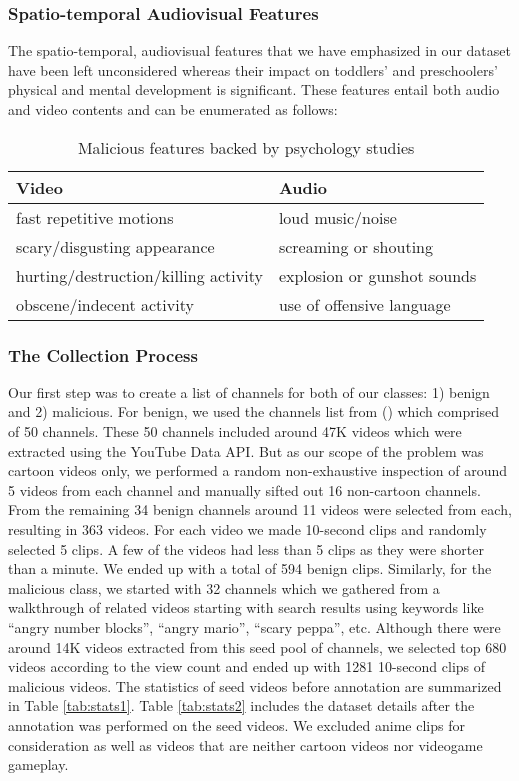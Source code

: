 \documentclass[letterpaper]{article}
\begin{document}
\subsubsection{Spatio-temporal Audiovisual Features}
The spatio-temporal, audiovisual features that we have emphasized in our dataset have been left unconsidered whereas their impact on toddlers' and preschoolers' physical and mental development is significant. These features entail both audio and video contents and can be enumerated as follows:
\begin{table}[h!]
\centering
\begin{tabular}{|p{} | p{}|}
 \hline
 \rowcolor{Gray}
 \textbf{Video} & \textbf{Audio} \\ [0.5ex] 
 \hline
 fast repetitive motions & loud music/noise\\ 
 \hline
 scary/disgusting appearance & screaming or shouting\\
 \hline
 hurting/destruction/killing activity & explosion or gunshot sounds\\ 
 \hline
obscene/indecent activity & use of offensive language  \\
 \hline
\end{tabular}
\caption{Malicious  features backed by psychology studies}
\label{tab:features}
\end{table}

\subsubsection{The Collection Process}
Our first step was to create a list of channels for both of our classes: 1) benign and 2) malicious. For benign, we used the channels list from \citeauthor{4} (\citeyear{4}) which comprised of 50 channels. These 50 channels included around 47K videos which were extracted using the YouTube Data API. But as our scope of the problem was cartoon videos only, we performed a random non-exhaustive inspection of around 5 videos from each channel and manually sifted out 16 non-cartoon channels. From the remaining 34 benign channels around 11 videos were selected from each, resulting in 363 videos. For each video we made 10-second clips and randomly selected 5 clips. A few of the videos had less than 5 clips as they were shorter than a minute. We ended up with a total of 594 benign  clips. Similarly, for the malicious class, we started with 32 channels which we gathered from a walkthrough of related videos starting with search results using keywords like ``angry number blocks'', ``angry mario'', ``scary peppa'', etc. Although there were around 14K videos extracted from this seed pool of channels, we selected top 680 videos according to the view count and ended up with 1281 10-second clips of malicious videos. The statistics of seed videos before annotation are summarized in Table \ref{tab:stats1}. Table \ref{tab:stats2} includes the dataset details after the annotation was performed on the seed videos. We excluded anime clips for consideration as well as videos that are neither cartoon videos nor videogame gameplay.
\end{document}
